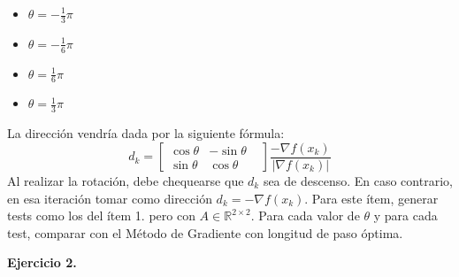 \documentclass{article}
\begin{document}
\begin{enumerate}
    \begin{itemize}
        \item $\theta = -\frac{1}{3}\pi$
        \item $\theta = -\frac{1}{6}\pi$
        \item $\theta = \frac{1}{6}\pi$
        \item $\theta = \frac{1}{3}\pi$
    \end{itemize}
    La dirección vendría dada por la siguiente fórmula:
    \[ d_k = \begin{bmatrix}\cos\theta & -\sin\theta &\\\sin\theta & \cos\theta \end{bmatrix}\frac{-\nabla f(x_{k})}{|\nabla f(x_{k})|}
\]
    Al realizar la rotación, debe chequearse que $d_k$ sea de descenso. En caso contrario, en esa iteración tomar como dirección $d_k = -\nabla f(x_k)$. 
    Para este ítem, generar tests como los del ítem 1. pero con $A\in\mathbb{R}^{2\times 2}$. 
    Para cada valor de $\theta$ y para cada test, comparar con el Método de Gradiente con longitud de paso óptima.

\end{enumerate}

\textbf{Ejercicio 2.}
\end{document}
